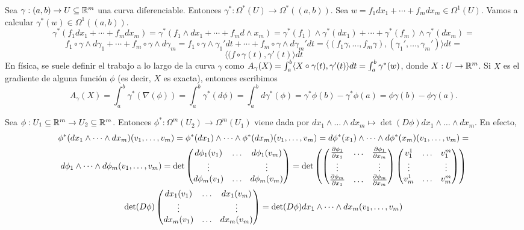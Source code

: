 \documentclass[CV.tex]{subfiles}
\begin{document}
\begin{ej}
Sea $\gamma:(a,b)\to U\subseteq\mathbb{R}^m$ una curva diferenciable. Entonces $\gamma^*:\Omega^*(U)\to\Omega^*((a,b))$. Sea $w=f_1dx_1+\cdots+f_m dx_m\in\Omega^1(U)$. Vamos a calcular $\gamma^*(w)\in\Omega^1((a,b))$.
\[
\gamma^*(f_1dx_1+\cdots+f_m dx_m)=\gamma^*(f_1\land dx_1+\cdots+f_m d\land x_m)=\gamma^*(f_1)\land\gamma^*(dx_1)+\cdots+\gamma^*(f_m)\land\gamma^*(dx_m)=
\]
\[
f_1\circ\gamma\land d\gamma_1+\cdots+f_m\circ\gamma\land d\gamma_m=f_1\circ\gamma\land \gamma_1'dt+\cdots+f_m\circ\gamma\land d\gamma_m'dt=\langle (f_1\gamma,\dots,f_m\gamma),(\gamma_1',\dots,\gamma_m')\rangle dt=
\]
\[
\langle (f\circ\gamma(t),\gamma'(t)\rangle dt
\]
En física, se suele definir el trabajo a lo largo de la curva $\gamma$ como $A_{\gamma}(X)=\int_a^b\langle{X\circ\gamma(t),\gamma'(t)}\rangle dt=\int_a^b\gamma^*(w)$, donde $X:U\to\mathbb{R}^m$. Si $X$ es el gradiente de alguna función $\phi$ (es decir, $X$ es exacta), entonces escribimos 
\[
A_{\gamma}(X)=\int_a^b\gamma^*(\nabla(\phi))=\int_a^b\gamma^*(d\phi)=\int_a^b d\gamma^*(\phi)=\gamma^*\phi(b)-\gamma^*\phi(a)=\phi\gamma(b)-\phi\gamma(a).
\]
\end{ej}
\begin{ej}\label{deter}
Sea $\phi:U_1\subseteq\mathbb{R}^m\to U_2\subseteq\mathbb{R}^m$. Entonces $\phi^*:\Omega^m(U_2)\to\Omega^m(U_1)$ viene dada por $dx_1\land\dots\land dx_m\mapsto \det(D\phi)dx_1\land\dots\land dx_m$. En efecto,
\begin{gather*}
\phi^*(dx_1\land\dots\land dx_m)(v_1,\dots, v_m)=\phi^*(dx_1)\land\dots\land\phi^*(dx_m)(v_1,\dots,v_m)=d\phi^*(x_1)\land\dots\land d\phi^*(x_m)(v_1,\dots, v_m)=\\
d\phi_1\land\dots\land d\phi_m(v_1,\dots, v_m)=\det\begin{pmatrix}
d\phi_1(v_1) & \dots & d\phi_1(v_m)\\
\vdots & &\vdots\\
d\phi_m(v_1) & \dots & d\phi_m(v_m)
\end{pmatrix}=\det\left(\begin{pmatrix}
\frac{\partial \phi_1}{\partial x_1} &\dots & \frac{\partial \phi_1}{\partial x_m}\\
\vdots & & \vdots\\
\frac{\partial \phi_m}{\partial x_1} & \dots & \frac{\partial \phi_m}{\partial x_m}
\end{pmatrix}\begin{pmatrix}
v_1^1 & \dots & v^m_1\\
\vdots & & \vdots\\
v_m^1 & \dots & v^m_m
\end{pmatrix}\right)\\
\det(D\phi)\begin{pmatrix}
dx_1(v_1) & \dots & dx_1(v_m)\\
\vdots & & \vdots\\
dx_m(v_1) & \dots & dx_m(v_m)
\end{pmatrix}=\det(D\phi)dx_1\land\dots\land dx_m(v_1,\dots, v_m)
\end{gather*}
\end{ej}
\end{document}
